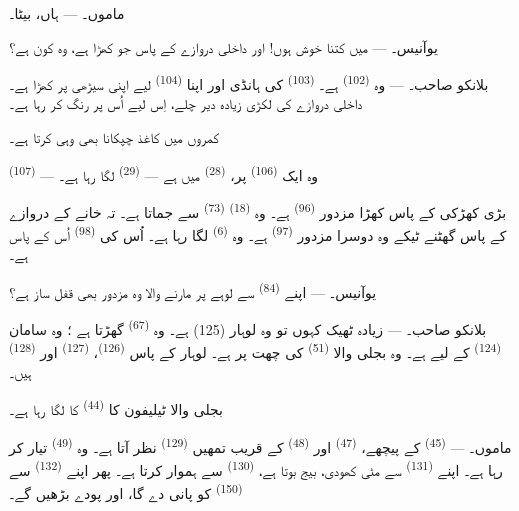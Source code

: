\textsc{ماموں}۔ --- ہاں، بیٹا۔

\textsc{یوآنیس}۔ --- میں کتنا خوش ہوں! اور داخلی دروازے کے پاس جو
کھڑا ہے، وہ کون ہے؟

\VUsaut{3.0mm}
\VUsaut{3.0mm}

\textsc{بلانکو صاحب}۔ --- وہ  \textsuperscript{(102)}
ہے۔  \textsuperscript{(103)} کی ہانڈی اور اپنا
 \textsuperscript{(104)} لیے اپنی سیڑھی پر کھڑا ہے۔ داخلی
دروازے کی لکڑی زیادہ دیر چلے، اِس لیے اُس پر رنگ کر رہا ہے۔

کمروں میں کاغذ چپکانا بھی وہی کرتا ہے۔

 \textsuperscript{(107)} — وہ ایک
 \textsuperscript{(106)} پر، 
\textsuperscript{(28)} میں ہے —  \textsuperscript{(29)}
لگا رہا ہے۔

بڑی کھڑکی کے پاس کھڑا مزدور  \textsuperscript{(96)}
ہے۔ وہ  \textsuperscript{(18)} 
\textsuperscript{(73)} سے جماتا ہے۔ تہ خانے کے دروازے کے پاس گھٹنے
ٹیکے وہ دوسرا مزدور  \textsuperscript{(97)} ہے۔ وہ
 \textsuperscript{(6)} لگا رہا ہے۔ اُس کی 
\textsuperscript{(98)} اُس کے پاس ہے۔

\textsc{یوآنیس}۔ --- اپنے  \textsuperscript{(84)} سے
لوہے پر مارنے والا وہ مزدور بھی قفل ساز ہے؟

\textsc{بلانکو صاحب}۔ --- زیادہ ٹھیک کہوں تو وہ لوہار (125) ہے۔ وہ
 \textsuperscript{(67)} گھڑتا ہے ؛ وہ سامان
 \textsuperscript{(124)} کے لیے ہے۔ وہ بجلی والا
 \textsuperscript{(51)} کی چھت پر ہے۔ لوہار کے پاس
 \textsuperscript{(126)}، 
\textsuperscript{(127)} اور  \textsuperscript{(128)}
ہیں۔

بجلی والا ٹیلیفون کا  \textsuperscript{(44)} کا
 لگا رہا ہے۔

\VUsaut{3.0mm}

\textsc{ماموں}۔ ---  \textsuperscript{(45)} کے پیچھے،
 \textsuperscript{(47)} اور 
\textsuperscript{(48)} کے قریب تمھیں 
\textsuperscript{(129)} نظر آتا ہے۔ وہ 
\textsuperscript{(49)} تیار کر رہا ہے۔ اپنے 
\textsuperscript{(131)} سے مٹی کھودی، بیج بوتا ہے،  \textsuperscript{(130)} سے ہموار کرتا ہے۔ پھر اپنے
 \textsuperscript{(132)} سے 
\textsuperscript{(150)} کو پانی دے گا، اور پودے بڑھیں گے۔

